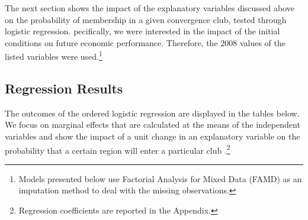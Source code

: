 \documentclass[11pt]{article}
\begin{document}
The next section shows the impact of the explanatory variables discussed above on the probability of membership in a given convergence club, tested through logistic regression. pecifically, we were interested in the impact of the initial conditions on future economic performance. Therefore, the 2008 values of the listed variables were used.\footnote{Models presented below use Factorial Analysis for Mixed Data (FAMD) as an imputation method to deal with the missing observations.}

\subsection{Regression Results}

The outcomes of the ordered logistic regression are displayed in the tables below. We focus on marginal effects that are calculated at the means of the independent variables and show the impact of a unit change in an explanatory variable on the probability that a certain region will enter a particular club \citep{carrolloglmx}.\footnote{Regression coefficients are reported in the Appendix.}
\end{document}
